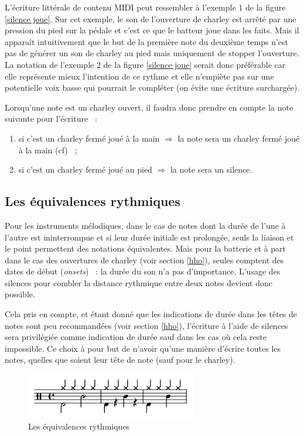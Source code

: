 L’écriture littérale de contenu MIDI peut ressembler à l’exemple 1 de la figure
\ref{silence joue}. Sur cet exemple, le son de l’ouverture de charley est
arrêté par une pression du pied sur la pédale et c’est ce que le batteur joue
dans les faits. Mais il apparaît intuitivement que le but de la première note
du deuxième temps n’est pas de générer un son de charley au pied mais
uniquement de stopper l’ouverture. La notation de l’exemple 2 de la figure
\ref{silence joue} serait donc préférable car elle représente mieux l’intention
de ce rythme et elle n’empiète pas sur une potentielle voix basse qui pourrait
le compléter (on évite une écriture surchargée).

Lorsqu’une note est un charley ouvert, il faudra donc prendre en compte la note
suivante pour l’écriture~ :
\begin{enumerate}
    \item si c’est un charley fermé joué à la main $\Rightarrow$ la note sera
        un charley fermé joué à la main (cf)~ ;
    \item si c’est un charley fermé joué au pied $\Rightarrow$ la note sera un
        silence.
\end{enumerate}

\subsection*{Les équivalences rythmiques}
Pour les instruments mélodiques, dans le cas de notes dont la durée de l’une à
l’autre est ininterrompue et si leur durée initiale est prolongée, seuls la
liaison et le point permettent des notations équivalentes. Mais pour la
batterie et à part dans le cas des ouvertures de charley (voir section
\ref{hho}), seules comptent des dates de début (\textit{onsets})~ : la durée du son n’a
pas d’importance. L’usage des silences pour combler la distance rythmique entre
deux notes devient donc possible.

Cela pris en compte, et étant donné que les indications de durée dans les têtes
de notes sont peu recommandées (voir section \ref{hho}), l’écriture à l’aide de
silences sera privilégiée comme indication de durée sauf dans les cas où cela
reste impossible. Ce choix à pour but de n’avoir qu’une manière d’écrire toutes
les notes, quelles que soient leur tête de note (sauf pour le charley).

\begin{figure}[h]
	\centering
	\includegraphics[height=20mm, width=75mm]{
    z_images/3_methodes/0_notation_de_la_batterie/6_equivalence.png}
	\caption{Les équivalences rythmiques}
	\label{equivalence}
\end{figure}

